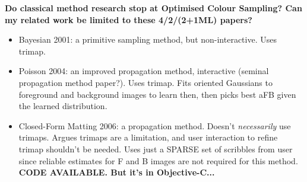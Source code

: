 \documentclass{article}
\begin{document}
\begin{multicols}{2}[]







\textbf{Do classical method research stop at Optimised Colour Sampling? Can my related work be limited to these 4/2/(2+1ML) papers?}


\begin{itemize}
    \item Bayesian 2001: a primitive sampling method, but non-interactive. Uses trimap.
    \item Poisson 2004: an improved propagation method, interactive (seminal propagation method paper?). Uses trimap. Fits oriented Gaussians to foreground and background images to learn then, then picks best aFB given the learned distribution.
\end{itemize}
\begin{itemize}
    \item Closed-Form Matting 2006: a propagation method. Doesn't \emph{necessarily} use trimaps. Argues trimaps are a limitation, and user interaction to refine trimap shouldn't be needed. Uses just a SPARSE set of scribbles from user since reliable estimates for F and B images are not required for this method. \textbf{CODE AVAILABLE. But it's in Objective-C...}


\end{itemize}
\end{multicols}
\end{document}

